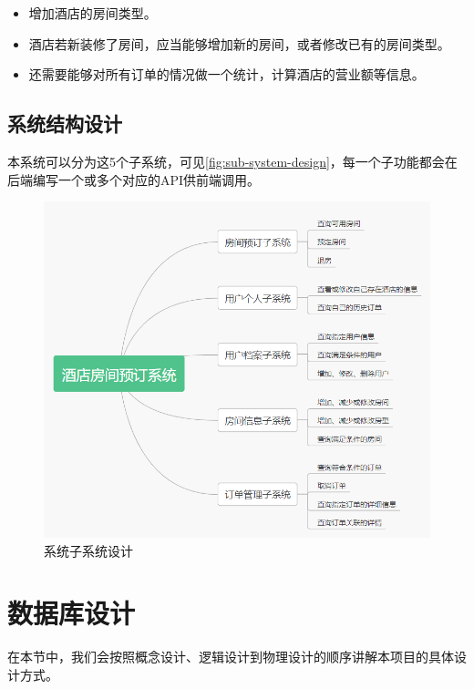 \documentclass{myreport}
\begin{document}
\begin{itemize}
    \item 增加酒店的房间类型。
    \item 酒店若新装修了房间，应当能够增加新的房间，或者修改已有的房间类型。
    \item 还需要能够对所有订单的情况做一个统计，计算酒店的营业额等信息。
\end{itemize}

\section{系统结构设计}

本系统可以分为这5个子系统，可见\autoref{fig:sub-system-design}，每一个子功能都会在后端编写一个或多个对应的API供前端调用。

\begin{figure}[htp]
    \centering
    \includegraphics[width=13cm]{figure/2018-12-22-10-31-35.png}
    \caption{系统子系统设计}
    \label{fig:sub-system-design}
\end{figure}


\chapter{数据库设计}
在本节中，我们会按照概念设计、逻辑设计到物理设计的顺序讲解本项目的具体设计方式。
\end{document}
